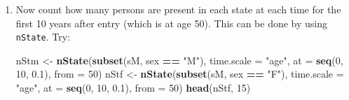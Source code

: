 \documentclass[
]{book}
\newenvironment{Shaded}{\begin{snugshade}}{\end{snugshade}}
\newcommand{\AttributeTok}[1]{\textcolor[rgb]{0.13,0.29,0.53}{#1}}
\newcommand{\DecValTok}[1]{\textcolor[rgb]{0.00,0.00,0.81}{#1}}
\newcommand{\FloatTok}[1]{\textcolor[rgb]{0.00,0.00,0.81}{#1}}
\newcommand{\FunctionTok}[1]{\textcolor[rgb]{0.13,0.29,0.53}{\textbf{#1}}}
\newcommand{\NormalTok}[1]{#1}
\newcommand{\OtherTok}[1]{\textcolor[rgb]{0.56,0.35,0.01}{#1}}
\newcommand{\SpecialCharTok}[1]{\textcolor[rgb]{0.81,0.36,0.00}{\textbf{#1}}}
\newcommand{\StringTok}[1]{\textcolor[rgb]{0.31,0.60,0.02}{#1}}
\begin{document}
\begin{enumerate}
\begin{Shaded}
\begin{Highlighting}[]
\FunctionTok{summary}\NormalTok{(sM, }\AttributeTok{by =} \StringTok{"sex"}\NormalTok{)}
\end{Highlighting}
\end{Shaded}

\begin{Shaded}
\begin{Highlighting}[]
\NormalTok{$M}

\NormalTok{Transitions:}
\NormalTok{     To}
\NormalTok{From  NRA Rem ESRD ESRD(Rem)  Records:  Events: Risk time:  Persons:}
\NormalTok{  NRA  46  78  376         0       500      454    2707.59       500}
\NormalTok{  Rem   0  51    0        27        78       27     569.15        78}
\NormalTok{  Sum  46 129  376        27       578      481    3276.74       500}

\NormalTok{$F}

\NormalTok{Transitions:}
\NormalTok{     To}
\NormalTok{From  NRA Rem ESRD ESRD(Rem)  Records:  Events: Risk time:  Persons:}
\NormalTok{  NRA  27 168  305         0       500      473    2481.57       500}
\NormalTok{  Rem   0  96    0        72       168       72    1092.90       168}
\NormalTok{  Sum  27 264  305        72       668      545    3574.47       500}
\end{Highlighting}
\end{Shaded}

  Why are there so many ESRD-events in the resulting data set?
\item
  Now count how many persons are present in each state
  at each time for the first 10 years after entry (which is at age 50). This
  can be done by using \texttt{nState}. Try:

\begin{Shaded}
\begin{Highlighting}[]
\NormalTok{nStm }\OtherTok{\textless{}{-}} \FunctionTok{nState}\NormalTok{(}\FunctionTok{subset}\NormalTok{(sM, sex }\SpecialCharTok{==} \StringTok{"M"}\NormalTok{), }\AttributeTok{time.scale =} \StringTok{"age"}\NormalTok{, }
               \AttributeTok{at =} \FunctionTok{seq}\NormalTok{(}\DecValTok{0}\NormalTok{, }\DecValTok{10}\NormalTok{, }\FloatTok{0.1}\NormalTok{), }
             \AttributeTok{from =} \DecValTok{50}\NormalTok{)}
\NormalTok{nStf }\OtherTok{\textless{}{-}} \FunctionTok{nState}\NormalTok{(}\FunctionTok{subset}\NormalTok{(sM, sex }\SpecialCharTok{==} \StringTok{"F"}\NormalTok{), }\AttributeTok{time.scale =} \StringTok{"age"}\NormalTok{, }
               \AttributeTok{at =} \FunctionTok{seq}\NormalTok{(}\DecValTok{0}\NormalTok{, }\DecValTok{10}\NormalTok{, }\FloatTok{0.1}\NormalTok{), }
             \AttributeTok{from =} \DecValTok{50}\NormalTok{)}
\FunctionTok{head}\NormalTok{(nStf, }\DecValTok{15}\NormalTok{)}
\end{Highlighting}
\end{Shaded}


\end{enumerate}
\end{document}
